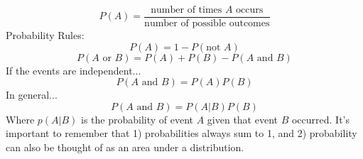 \documentclass{tufte-handout}
\begin{document}
\begin{equation*}
P(A)=\frac{\text{number of times } A \text{ occurs}}{\text{number of possible outcomes}}
\end{equation*}
Probability Rules:
\begin{equation*}
P(A)=1-P(\text{not } A)
\end{equation*}
\begin{equation*}
P(A \text{ or } B)=P(A)+P(B)-P(A \text{ and } B)
\end{equation*}
If the events are independent...
\begin{equation*}
P(A \text{ and } B)=P(A)P(B)
\end{equation*}
In general...
\begin{equation*}
P(A \text{ and } B)=P(A|B)P(B)
\end{equation*}
Where $p(A|B)$ is the probability of event $A$ given that event $B$ occurred. It's important to remember that 1) probabilities always sum to 1, and 2) probability can also be thought of as an area under a distribution.
\end{document}
